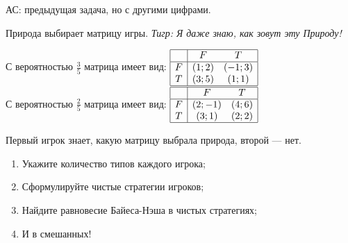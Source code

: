 \begin{problem}
{\red АС: предыдущая задача, но с другими цифрами.}

Природа выбирает матрицу игры. {\it Тигр: Я даже знаю, как зовут эту Природу!}\par
С вероятностью  $\frac{3}{5} $  матрица имеет вид:  $\begin{array}{|c|cc|}  \hline {} & {F} & {T} \\  \hline {F} & {\left(1;2\right)} & {\left(-1;3\right)} \\ {T} & {\left(3;5\right)} & {\left(1;1\right)} \\  \hline  \end{array}$ \\
С вероятностью  $\frac{2}{5} $  матрица имеет вид:  $\begin{array}{|c|cc|}  \hline {} & {F} & {T} \\  \hline {F} & {\left(2;-1\right)} & {\left(4;6\right)} \\ {T} & {\left(3;1\right)} & {\left(2;2\right)} \\  \hline  \end{array}$

Первый игрок знает, какую матрицу выбрала природа, второй --- нет.\par
\begin{enumerate}
\item	Укажите количество типов каждого игрока;\par
\item 	Сформулируйте чистые стратегии игроков;\par
\item 	Найдите равновесие Байеса-Нэша в чистых стратегиях;\par
\item	И в смешанных!\par
\end{enumerate}


\begin{sol}

\end{sol}
\end{problem}


